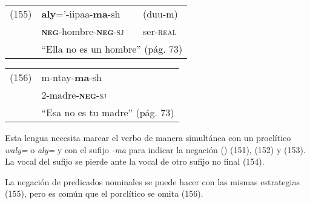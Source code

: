 {%
\begin{tabular}{lll}
(155) & \textbf{aly}='-iipaa-\textbf{ma}-sh & (duu-m) \\
& \textsc{\textbf{neg}}-hombre-\textsc{\textbf{neg}-sj} & ser-\textsc{real} \\
& \multicolumn{2}{l}{``Ella no es un hombre'' (pág. 73)}
\end{tabular} \vspace{0.5cm}

\begin{tabular}{ll}
(156) & m-ntay-\textbf{ma}-sh \\
& 2-madre-\textsc{\textbf{neg}-sj} \\
& ``Esa no es tu madre'' (pág. 73)
\end{tabular} \vspace{0.5cm}

}

Esta lengua necesita marcar el verbo de manera simultánea con un proclítico {\setmainfont{Charis SIL} \textit{waly=}} o {\setmainfont{Charis SIL} \textit{aly=}} y con el sufijo {\setmainfont{Charis SIL} \textit{-ma}} para indicar la negación (\textcolor{MidnightBlue}{\citep{maricopa}}) (151), (152) y (153). La vocal del sufijo se pierde ante la vocal de otro sufijo no final (154).

La negación de predicados nominales se puede hacer con las mismas estrategias (155), pero es común que el porclítico se omita (156).